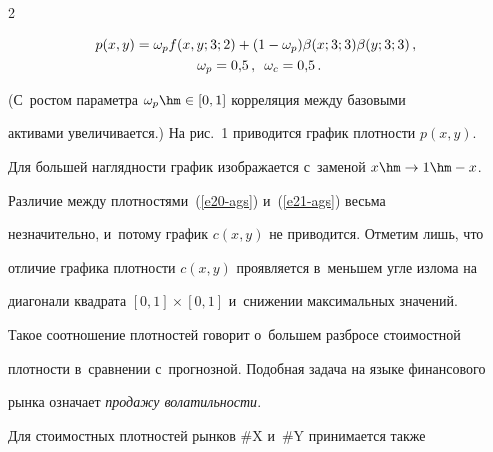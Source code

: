 \begin{multicols}{2}
     


  \vspace*{-3pt}


  


  \noindent


  \begin{multline}


  \!\!\!p(x,y)=\omega_p f(x,y;3;2)+(1-\omega_p)\beta(x;3;3)\beta(y;3;3)\,,\\


  \omega_p=0{,}5\,,\enskip \omega_c=0{,}5\,.


  \label{e21-ags}


  \end{multline}


  


  \vspace*{-2pt}


  


  \noindent


(С~ростом параметра $\omega_p\hm\in [0,1]$ корреляция между базовыми 


активами увеличивается.) На рис.~1 приводится график плотности $p(x, y)$. 








  


  Для большей наглядности график изображается с~заменой $x\hm\to 1\hm - x$. 


Различие между плотностями~(\ref{e20-ags}) и~(\ref{e21-ags}) весьма 


незначительно, и~потому график $c(x,y)$ не приводится. Отметим лишь, что 


отличие графика плотности $c(x,y)$ проявляется в~меньшем угле излома на 


диагонали квадрата $[0, 1]\times[0, 1]$ и~снижении максимальных значений. 


Такое соотношение плотностей говорит о~большем разбросе стоимостной 


плотности в~сравнении с~прогнозной. Подобная задача на языке финансового 


рынка означает \textit{продажу волатильности}. 


  


  Для стоимостных плотностей рынков \#X и~\#Y принимается также 



\end{multicols}

